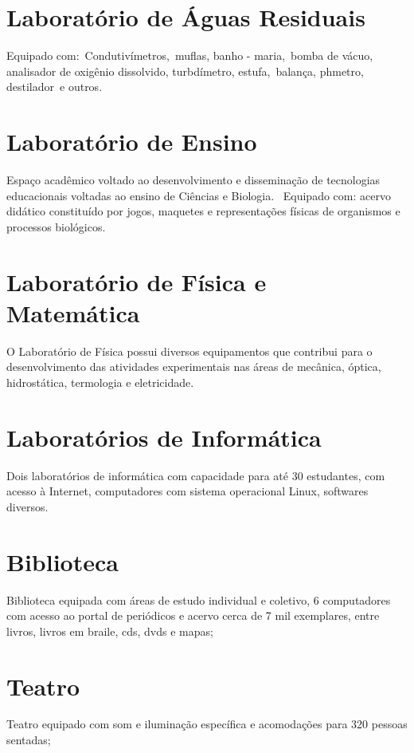 \documentclass[11pt,fleqn]{book} %
\begin{document}
\section{Laboratório de Águas Residuais}

Equipado com: Condutivímetros, muflas, banho - maria, bomba de vácuo, analisador de oxigênio dissolvido, turbdímetro, estufa, balança, phmetro, destilador e outros.

\section{Laboratório de Ensino}

Espaço acadêmico voltado ao desenvolvimento e disseminação de tecnologias educacionais voltadas ao ensino de Ciências e Biologia.  Equipado com: acervo didático constituído por jogos, maquetes e representações físicas de organismos e processos biológicos.

\section{Laboratório de Física e Matemática}

O Laboratório de Física possui diversos equipamentos que contribui para o desenvolvimento das atividades experimentais nas áreas de mecânica, óptica, hidrostática, termologia e eletricidade.


\section{Laboratórios de Informática}

Dois laboratórios de informática com capacidade para até 30 estudantes, com acesso à Internet, computadores com sistema operacional Linux, softwares diversos.


\section{Biblioteca}

Biblioteca equipada com áreas de estudo individual e coletivo, 6 computadores com acesso ao portal de periódicos e acervo cerca de 7 mil exemplares, entre livros, livros em braile, cds, dvds e mapas;

\section{Teatro}

Teatro equipado com som e iluminação específica e acomodações para 320 pessoas sentadas;
\end{document}
